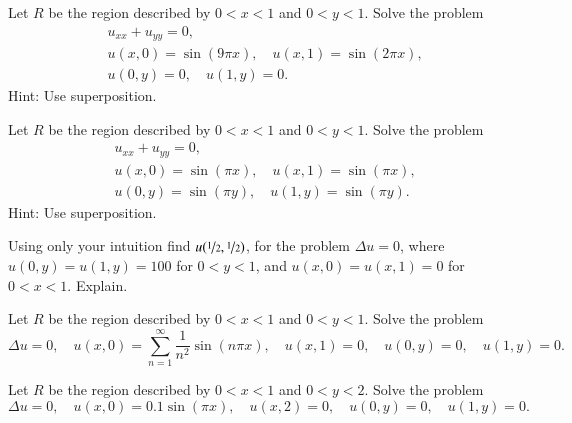 \begin{exercise}
Let $R$ be the region described by $0 < x < 1$ and $0 < y < 1$.
Solve the problem
\begin{align*}
& u_{xx} + u_{yy} = 0, \\
& u(x,0) = \sin (9 \pi x), \quad u(x,1) = \sin (2 \pi x), \\
& u(0,y) = 0, \quad u(1,y) = 0 .
\end{align*}
Hint: Use superposition.
\end{exercise}

\begin{exercise}
Let $R$ be the region described by $0 < x < 1$ and $0 < y < 1$.
Solve the problem
\begin{align*}
& u_{xx} + u_{yy} = 0, \\
& u(x,0) = \sin (\pi x), \quad u(x,1) = \sin (\pi x), \\
& u(0,y) = \sin (\pi y), \quad u(1,y) = \sin (\pi y) .
\end{align*}
Hint: Use superposition.
\end{exercise}

\begin{exercise}[challenging]
Using only your intuition find $u(\nicefrac{1}{2},\nicefrac{1}{2})$,
for the problem
$\Delta u = 0$, where $u(0,y) = u(1,y) = 100$ for $0 < y < 1$, and
$u(x,0) = u(x,1) = 0$ for $0 < x < 1$.  Explain.
\end{exercise}

\setcounter{exercise}{100}

\begin{exercise}
Let $R$ be the region described by $0 < x < 1$ and $0 < y < 1$.
Solve the problem
\begin{equation*}
\Delta u = 0, \quad u(x,0) = \sum_{n=1}^\infty \frac{1}{n^2} \sin (n \pi x),
\quad u(x,1) = 0,
\quad u(0,y) = 0, 
\quad u(1,y) = 0 .
\end{equation*}
\end{exercise}

\begin{exercise}
Let $R$ be the region described by $0 < x < 1$ and $0 < y < 2$.
Solve the problem
\begin{equation*}
\Delta u = 0, \quad u(x,0) = 0.1 \sin (\pi x),
\quad u(x,2) = 0,
\quad u(0,y) = 0, 
\quad u(1,y) = 0 .
\end{equation*}
\end{exercise}

